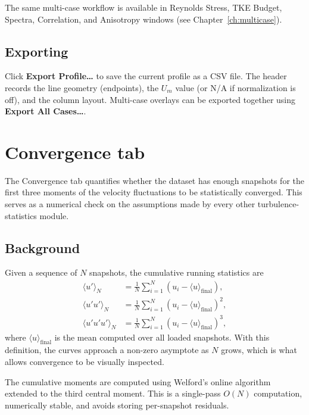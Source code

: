 \documentclass[11pt, a4paper]{report}
\newcommand{\uipth}[1]{\textbf{\textcolor{upblue}{#1}}}
\begin{document}
The same multi-case workflow is available in Reynolds Stress, TKE Budget, Spectra, Correlation, and Anisotropy windows (see Chapter~\ref{ch:multicase}).

\subsection{Exporting}

Click \uipth{Export Profile\ldots} to save the current profile as a CSV file. The header records the line geometry (endpoints), the $U_m$ value (or N/A if normalization is off), and the column layout. Multi-case overlays can be exported together using \uipth{Export All Cases\ldots}.

\section{Convergence tab}
\label{sec:convergence}

The Convergence tab quantifies whether the dataset has enough snapshots for the first three moments of the velocity fluctuations to be statistically converged. This serves as a numerical check on the assumptions made by every other turbulence-statistics module.

\subsection{Background}

Given a sequence of $N$ snapshots, the cumulative running statistics are
\begin{align}
\langle u' \rangle_N      &= \frac{1}{N} \sum_{i=1}^{N} (u_i - \langle u \rangle_{\mathrm{final}}), \\
\langle u' u' \rangle_N   &= \frac{1}{N} \sum_{i=1}^{N} (u_i - \langle u \rangle_{\mathrm{final}})^2, \\
\langle u' u' u' \rangle_N &= \frac{1}{N} \sum_{i=1}^{N} (u_i - \langle u \rangle_{\mathrm{final}})^3,
\end{align}
where $\langle u \rangle_{\mathrm{final}}$ is the mean computed over all loaded snapshots. With this definition, the curves approach a non-zero asymptote as $N$ grows, which is what allows convergence to be visually inspected.

The cumulative moments are computed using Welford's online algorithm extended to the third central moment. This is a single-pass $O(N)$ computation, numerically stable, and avoids storing per-snapshot residuals.
\end{document}
